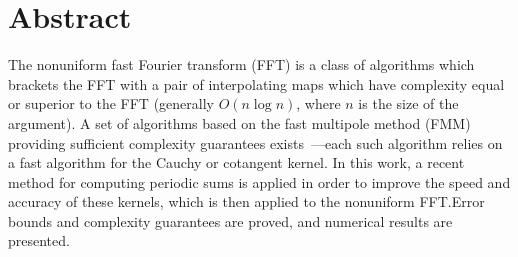 \section*{Abstract}

The nonuniform fast Fourier transform (FFT) is a class of algorithms
which brackets the FFT with a pair of interpolating maps which have
complexity equal or superior to the FFT (generally $O(n \log n)$,
where $n$ is the size of the argument). A set of algorithms based on
the fast multipole method (FMM) providing sufficient complexity
guarantees exists~\cite{Dutt95fastfourierII}---each such algorithm
relies on a fast algorithm for the Cauchy or cotangent kernel. In this
work, a recent method for computing periodic sums is applied in order
to improve the speed and accuracy of these kernels, which is then
applied to the nonuniform FFT.\@ Error bounds and complexity
guarantees are proved, and numerical results are presented.

